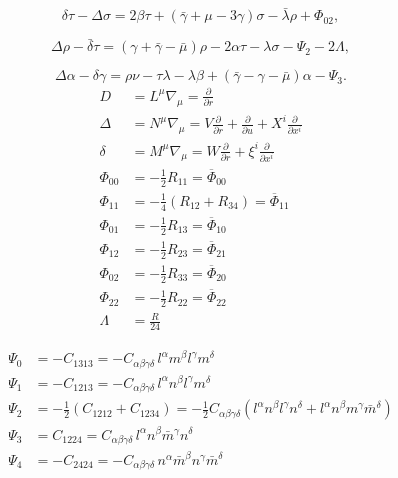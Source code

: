\[
\delta \tau - \Delta \sigma = 2\beta\tau + (\bar{\gamma} + \mu - 3\gamma)\sigma - \bar{\lambda}\rho + \Phi_{02}, \tag{3.25}
\]

\[
\Delta \rho - \bar{\delta}\tau = (\gamma + \bar{\gamma} - \bar{\mu})\rho - 2\alpha\tau - \lambda\sigma - \Psi_{2} - 2\Lambda, \tag{3.26}
\]

\[
\Delta \alpha - \delta \gamma = \rho\nu - \tau\lambda - \lambda\beta + (\bar{\gamma} - \gamma - \bar{\mu})\alpha - \Psi_{3}. \tag{3.27}
\]
\begin{align}
D &= L^{\mu} \nabla_{\mu} = \frac{\partial}{\partial r} \tag{3.28} \\[6pt]
\Delta &= N^{\mu} \nabla_{\mu} = V \frac{\partial}{\partial r} 
   + \frac{\partial}{\partial u} + X^{i}\frac{\partial}{\partial x^{i}} \tag{3.29} \\[6pt]
\delta &= M^{\mu} \nabla_{\mu} = W \frac{\partial}{\partial r} 
   + \xi^{i}\frac{\partial}{\partial x^{i}} \tag{3.30} \\[6pt]
\Phi_{00} &= -\tfrac{1}{2} R_{11} = \overline{\Phi}_{00} \tag{3.31} \\[6pt]
\Phi_{11} &= -\tfrac{1}{4}(R_{12} + R_{34}) = \overline{\Phi}_{11} \tag{3.32} \\[6pt]
\Phi_{01} &= -\tfrac{1}{2} R_{13} = \overline{\Phi}_{10} \tag{3.33} \\[6pt]
\Phi_{12} &= -\tfrac{1}{2} R_{23} = \overline{\Phi}_{21} \tag{3.34} \\[6pt]
\Phi_{02} &= -\tfrac{1}{2} R_{33} = \overline{\Phi}_{20} \tag{3.35} \\[6pt]
\Phi_{22} &= -\tfrac{1}{2} R_{22} = \overline{\Phi}_{22} \tag{3.36} \\[6pt]
\Lambda &= \tfrac{R}{24} \tag{3.37}
\end{align}

\begin{align}
\Psi_{0} &= -C_{1313} 
= - C_{\alpha \beta \gamma \delta} \, l^{\alpha} m^{\beta} l^{\gamma} m^{\delta} 
\tag{3.38} \\[10pt]
%
\Psi_{1} &= -C_{1213} 
= - C_{\alpha \beta \gamma \delta} \, l^{\alpha} n^{\beta} l^{\gamma} m^{\delta} 
\tag{3.39} \\[10pt]
%
\Psi_{2} &= -\tfrac{1}{2} \left( C_{1212} + C_{1234} \right) 
= -\tfrac{1}{2} C_{\alpha \beta \gamma \delta} 
\left( l^{\alpha} n^{\beta} l^{\gamma} n^{\delta} 
+ l^{\alpha} n^{\beta} m^{\gamma} \bar{m}^{\delta} \right) 
\tag{3.40} \\[10pt]
%
\Psi_{3} &= C_{1224} 
= C_{\alpha \beta \gamma \delta} \, l^{\alpha} n^{\beta} \bar{m}^{\gamma} n^{\delta} 
\tag{3.41} \\[10pt]
%
\Psi_{4} &= -C_{2424} 
= - C_{\alpha \beta \gamma \delta} \, n^{\alpha} \bar{m}^{\beta} n^{\gamma} \bar{m}^{\delta} 
\tag{3.42}
\end{align}





